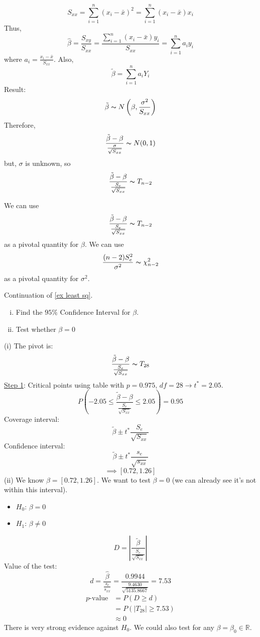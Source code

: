 \[ S_{xx}=\sum\limits_{i=1}^{n}(x_i-\bar{x})^2=\sum\limits_{i=1}^{n} (x_i-\bar{x})x_i \]
Thus,
\[ \hat{\beta}=\frac{S_{xy}}{S_{xx}}=\frac{\sum\limits_{i=1}^{n} (x_i-\bar{x})y_i}{S_{xx}}=\sum\limits_{i=1}^{n} a_iy_i  \]
where $ a_i=\frac{x_i-\bar{x}}{S_{xx}} $.
Also,
\[ \tilde{\beta}=\sum\limits_{i=1}^{n} a_iY_i \]
Result:
\[ \tilde{\beta} \thicksim N\left(\beta,\frac{\sigma^2}{S_{xx}}\right) \]
Therefore,
\[ \frac{\tilde{\beta}-\beta}{\frac{\sigma}{\sqrt{S_{xx}}}} \thicksim N(0,1) \]
but, $ \sigma $ is unknown, so
\[ \frac{\tilde{\beta}-\beta}{\frac{S_e}{\sqrt{S_{xx}}}} \thicksim T_{n-2}  \]
\begin{thmbox}
    \begin{theorem} We can use
        \[ \frac{\tilde{\beta}-\beta}{\frac{S_e}{\sqrt{S_{xx}}}} \thicksim T_{n-2} \]
        as a pivotal quantity for $ \beta $. We can use
        \[ \frac{(n-2)S_e^2}{\sigma^2} \thicksim \chi^2_{n-2} \]
        as a pivotal quantity for $ \sigma^2 $.
    \end{theorem}
\end{thmbox}
\begin{exbox}
    \begin{example} Continuation of \ref{ex least sq}.
        \begin{enumerate}[(i)]
            \item Find the $ 95\% $ Confidence Interval for $ \beta $.
            \item Test whether $ \beta=0 $
        \end{enumerate}
        (i) The pivot is:
        \[ \frac{\tilde{\beta}-\beta}{\frac{S_e}{\sqrt{S_{xx}}}} \thicksim T_{28} \]
        \underline{Step 1}: Critical points using table with $ p=0.975,\,df=28\rightarrow t^*=2.05 $.
        \[ P\left(-2.05\leqslant \frac{\tilde{\beta}-\beta}{\frac{S_e}{\sqrt{S_{xx}}}}\leqslant 2.05\right)=0.95\]
        Coverage interval:
        \[ \tilde{\beta}\pm t^* \frac{S_e}{\sqrt{S_{xx}}} \]
        Confidence interval:
        \[ \tilde{\beta}\pm t^* \frac{s_e}{\sqrt{s_{xx}}} \]
        \[ \implies [0.72,1.26] \]
        (ii) We know $ \beta=[0.72,1.26] $. We want to test $ \beta=0 $ (we can already see it's
        not within this interval).
        \begin{itemize}
            \item $ H_0 $: $ \beta=0 $
            \item $ H_1 $: $ \beta\neq 0 $
        \end{itemize}
        \[ D=\left|\frac{\tilde{\beta}}{\frac{S_e}{\sqrt{S_{xx}}}}\right| \]
        Value of the test:
        \[ d=\frac{\hat{\beta}}{\frac{s_e}{s_{xx}}}=\frac{0.9944}{\frac{9.4630}{\sqrt{5135.8667}}}=7.53 \]
        \begin{align*}
            p\text{-value}
             & =P(D\geqslant d)           \\
             & =P(|T_{28}|\geqslant 7.53) \\
             & \approx 0
        \end{align*}
        There is very strong evidence against $ H_0 $.
        We could also test for any $ \beta=\beta_0\in\mathbb{R} $.
    \end{example}
\end{exbox}
